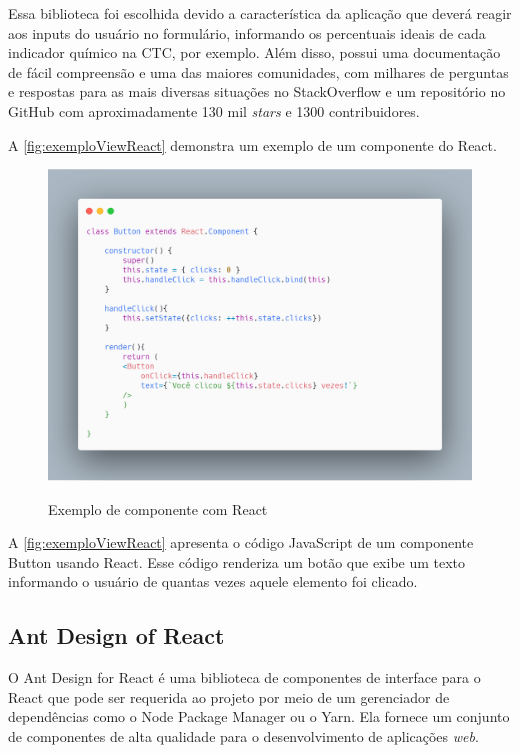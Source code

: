 Essa biblioteca foi escolhida devido a característica da aplicação que deverá reagir aos inputs do usuário no formulário, informando os percentuais ideais de cada indicador químico na CTC, por exemplo. Além disso, possui uma documentação de fácil compreensão e uma das maiores comunidades, com milhares de perguntas e respostas para as mais diversas situações no StackOverflow e um repositório no GitHub com aproximadamente 130 mil \textit{stars} e 1300 contribuidores. 

A \autoref{fig:exemploViewReact} demonstra um exemplo de um componente do React. 

\begin{figure}[H]
    \centering
    \caption{Exemplo de componente com React}
    \includegraphics[width=13cm]{dados/figuras/exemplo_react_component.png}
    \label{fig:exemploViewReact}
\end{figure}

A \autoref{fig:exemploViewReact} apresenta o código JavaScript de um componente Button usando React. Esse código renderiza um botão que exibe um texto informando o usuário de quantas vezes aquele elemento foi clicado.

\subsection{Ant Design of React}
\label{sub:ant}

O Ant Design for React é uma biblioteca de componentes de interface para o React que pode ser requerida ao projeto por meio de um gerenciador de dependências como o Node Package Manager ou o Yarn. Ela fornece um conjunto de componentes de alta qualidade para o desenvolvimento de aplicações \textit{web}.

